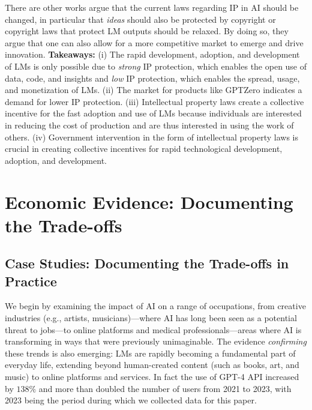 \documentclass{article} %
\begin{document}
There are other works argue that the current laws regarding IP in AI should be changed, in particular that \emph{ideas} should also be protected by copyright or copyright laws that protect LM outputs should be relaxed.
By doing so, they argue that one can also allow for a more competitive market to emerge and drive innovation.
\textbf{Takeaways:}
    (i) The rapid development, adoption, and development of LMs is only possible due to \emph{strong} IP protection, which enables the open use of data, code, and insights and \emph{low} IP protection, which enables the spread, usage, and monetization of LMs.
    (ii) The market for products like GPTZero indicates a demand for lower IP protection.
    (iii) Intellectual property laws create a collective incentive for the fast adoption and use of LMs because individuals are interested in reducing the cost of production and are thus interested in using the work of others.
    (iv) Government intervention in the form of intellectual property laws is crucial in creating collective incentives for rapid technological development, adoption, and development.

\section{Economic Evidence: Documenting the Trade-offs}

\label{Evidence}

\subsection{Case Studies: Documenting the Trade-offs in Practice}

We begin by examining the impact of AI on a range of occupations, from creative industries (e.g., artists, musicians)---where AI has long been seen as a potential threat to jobs---to online platforms and medical professionals---areas where AI is transforming in ways that were previously unimaginable.
The evidence \emph{confirming} these trends is also emerging: LMs are rapidly becoming a fundamental part of everyday life, extending beyond human-created content (such as books, art, and music) to online platforms and services. 
In fact the use of GPT-4 API increased by $138\%$ and more than doubled the number of users from 2021 to 2023, with 2023 being the period during which we collected data for this paper. 
\end{document}
